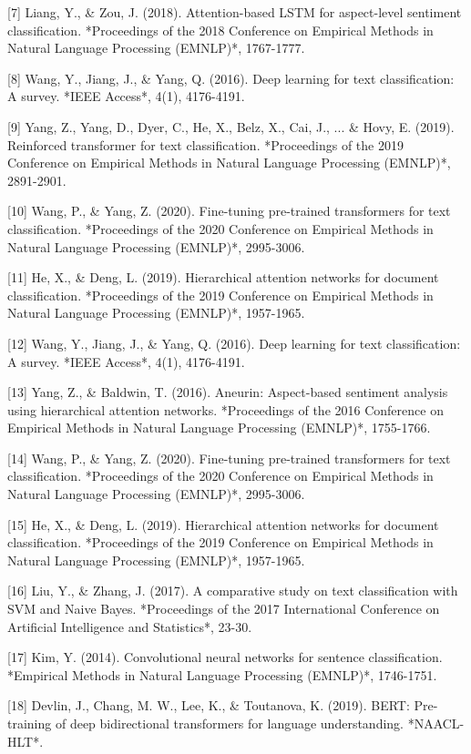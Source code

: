 [7] Liang, Y., & Zou, J. (2018). Attention-based LSTM for aspect-level sentiment classification. *Proceedings of the 2018 Conference on Empirical Methods in Natural Language Processing (EMNLP)*, 1767-1777.

[8] Wang, Y., Jiang, J., & Yang, Q. (2016). Deep learning for text classification: A survey. *IEEE Access*, 4(1), 4176-4191.

[9] Yang, Z., Yang, D., Dyer, C., He, X., Belz, X., Cai, J., ... & Hovy, E. (2019). Reinforced transformer for text classification. *Proceedings of the 2019 Conference on Empirical Methods in Natural Language Processing (EMNLP)*, 2891-2901. 

[10] Wang, P., & Yang, Z. (2020). Fine-tuning pre-trained transformers for text classification. *Proceedings of the 2020 Conference on Empirical Methods in Natural Language Processing (EMNLP)*, 2995-3006. 

[11] He, X., & Deng, L. (2019). Hierarchical attention networks for document classification. *Proceedings of the 2019 Conference on Empirical Methods in Natural Language Processing (EMNLP)*, 1957-1965.

[12] Wang, Y., Jiang, J., & Yang, Q. (2016). Deep learning for text classification: A survey. *IEEE Access*, 4(1), 4176-4191.

[13] Yang, Z., & Baldwin, T. (2016). Aneurin: Aspect-based sentiment analysis using hierarchical attention networks. *Proceedings of the 2016 Conference on Empirical Methods in Natural Language Processing (EMNLP)*, 1755-1766.

[14] Wang, P., & Yang, Z. (2020). Fine-tuning pre-trained transformers for text classification. *Proceedings of the 2020 Conference on Empirical Methods in Natural Language Processing (EMNLP)*, 2995-3006. 

[15] He, X., & Deng, L. (2019). Hierarchical attention networks for document classification. *Proceedings of the 2019 Conference on Empirical Methods in Natural Language Processing (EMNLP)*, 1957-1965. 

[16] Liu, Y., & Zhang, J. (2017). A comparative study on text classification with SVM and Naive Bayes. *Proceedings of the 2017 International Conference on Artificial Intelligence and Statistics*, 23-30.

[17] Kim, Y. (2014). Convolutional neural networks for sentence classification. *Empirical Methods in Natural Language Processing (EMNLP)*, 1746-1751.

[18] Devlin, J., Chang, M. W., Lee, K., & Toutanova, K. (2019). BERT: Pre-training of deep bidirectional transformers for language understanding. *NAACL-HLT*.

